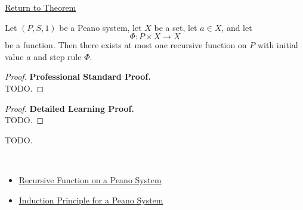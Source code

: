 \newpage
{}
\label{prf:recursive-specification-well-defined}

\begin{remark*}[Return]
\hyperref[thm:recursive-specification-well-defined]{Return to Theorem}
\end{remark*}

\begin{theorem*}
Let $(P,S,1)$ be a Peano system, let $X$ be a set, let $a \in X$, and let
\[
\Phi : P \times X \to X
\]
be a function. Then there exists at most one recursive function on $P$ with
initial value $a$ and step rule $\Phi$.
\end{theorem*}

\begin{proof}
\textbf{Professional Standard Proof.}~\\
TODO.
\end{proof}

\begin{proof}
\textbf{Detailed Learning Proof.}~\\
TODO.
\end{proof}

\begin{remark*}
TODO.
\end{remark*}

\begin{remark*}[Dependencies]~\\
\begin{itemize}
  \item \hyperref[def:recursive-function-on-peano-system]{Recursive Function on a Peano System}
  \item \hyperref[thm:induction-principle-for-peano-system]{Induction Principle for a Peano System}
\end{itemize}
\end{remark*}
